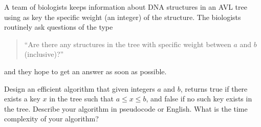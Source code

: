 A team of biologists keeps information about DNA structures in an AVL
tree using as key the specific weight (an integer) of the structure.
The biologists routinely ask questions of the type
%
\begin{quote}
``Are there any structures in the tree with specific weight between $a$
and $b$ (inclusive)?''
\end{quote}
%
and they hope to get an answer as soon as possible.

Design an efficient algorithm that given integers $a$ and $b$, returns
true if there exists a key $x$ in the tree such that $a \le  x \le  b$,
and false if no such key exists in the tree.  Describe your algorithm
in pseudocode or English. What is the time complexity of your
algorithm?
